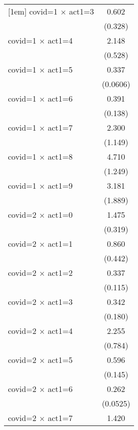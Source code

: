 {\begin{tabular}{l*{1}{c}}
[1em]
covid=1 $\times$ act1=3&       0.602         \\
                    &     (0.328)         \\
[1em]
covid=1 $\times$ act1=4&       2.148\sym{**} \\
                    &     (0.528)         \\
[1em]
covid=1 $\times$ act1=5&       0.337\sym{***}\\
                    &    (0.0606)         \\
[1em]
covid=1 $\times$ act1=6&       0.391\sym{**} \\
                    &     (0.138)         \\
[1em]
covid=1 $\times$ act1=7&       2.300         \\
                    &     (1.149)         \\
[1em]
covid=1 $\times$ act1=8&       4.710\sym{***}\\
                    &     (1.249)         \\
[1em]
covid=1 $\times$ act1=9&       3.181         \\
                    &     (1.889)         \\
[1em]
covid=2 $\times$ act1=0&       1.475         \\
                    &     (0.319)         \\
[1em]
covid=2 $\times$ act1=1&       0.860         \\
                    &     (0.442)         \\
[1em]
covid=2 $\times$ act1=2&       0.337\sym{**} \\
                    &     (0.115)         \\
[1em]
covid=2 $\times$ act1=3&       0.342\sym{*}  \\
                    &     (0.180)         \\
[1em]
covid=2 $\times$ act1=4&       2.255\sym{*}  \\
                    &     (0.784)         \\
[1em]
covid=2 $\times$ act1=5&       0.596\sym{*}  \\
                    &     (0.145)         \\
[1em]
covid=2 $\times$ act1=6&       0.262\sym{***}\\
                    &    (0.0525)         \\
[1em]
covid=2 $\times$ act1=7&       1.420         \\

\end{tabular}}
